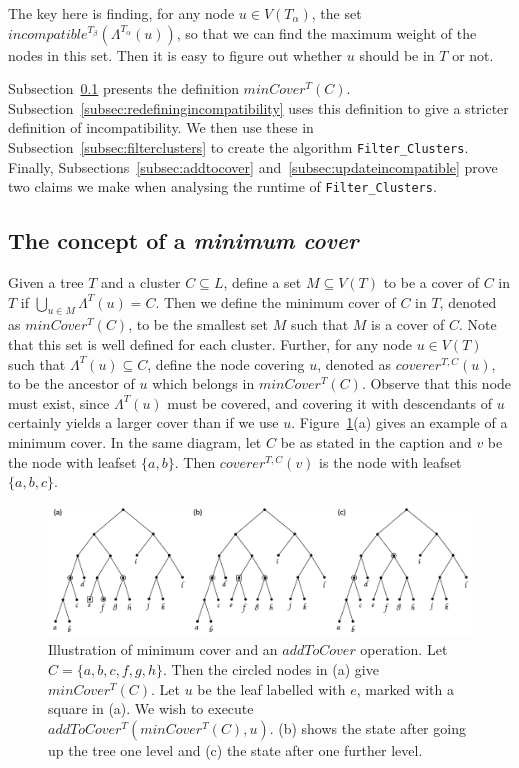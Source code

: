\documentclass{article}
\newcommand{\leafset}{\Lambda}
\newcommand{\TA}{T_\alpha}
\newcommand{\TB}{T_\beta}
\begin{document}
    The key here is finding, for any node $u \in V(\TA)$, the set $incompatible^{\TB}(\leafset^{\TA}(u))$, so that we can find the maximum weight of the nodes in this set. Then it is easy to figure out whether $u$ should be in $T$ or not.

    Subsection~\ref{subsec:mincover} presents the definition $minCover^{T}(C)$. Subsection~\ref{subsec:redefiningincompatibility} uses this definition to give a stricter definition of incompatibility. We then use these in Subsection~\ref{subsec:filterclusters} to create the algorithm \texttt{Filter\_Clusters}. Finally, Subsections~\ref{subsec:addtocover} and~\ref{subsec:updateincompatible} prove two claims we make when analysing the runtime of \texttt{Filter\_Clusters}.

    \subsection{The concept of a \textit{minimum cover}}
    \label{subsec:mincover}

    Given a tree $T$ and a cluster $C \subseteq L$, define a set $M \subseteq V(T)$ to be a cover of $C$ in $T$ if $\bigcup_{u \in M} \leafset^{T}(u) = C$. Then we define the minimum cover of $C$ in $T$, denoted as $minCover^{T}(C)$, to be the smallest set $M$ such that $M$ is a cover of $C$. Note that this set is well defined for each cluster. Further, for any node $u \in V(T)$ such that $\leafset^{T}(u) \subseteq C$, define the node covering $u$, denoted as $coverer^{T, C}(u)$, to be the ancestor of $u$ which belongs in $minCover^{T}(C)$. Observe that this node must exist, since $\leafset^{T}(u)$ must be covered, and covering it with descendants of $u$ certainly yields a larger cover than if we use $u$. Figure~\ref{fig:mincoverrecursive}(a) gives an example of a minimum cover. In the same diagram, let $C$ be as stated in the caption and $v$ be the node with leafset $\{a, b\}$. Then $coverer^{T, C}(v)$ is the node with leafset $\{a, b, c\}$.

    \begin{figure}[ht]
        \includegraphics[scale=0.48]{mincoverrecursive}
        \centering
        \caption{Illustration of minimum cover and an $addToCover$ operation. Let $C = \{a, b, c, f, g, h\}$. Then the circled nodes in (a) give $minCover^{T}(C)$. Let $u$ be the leaf labelled with $e$, marked with a square in (a). We wish to execute $addToCover^{T}(minCover^{T}(C), u)$. (b) shows the state after going up the tree one level and (c) the state after one further level.}
        \label{fig:mincoverrecursive}
    \end{figure}
\end{document}

